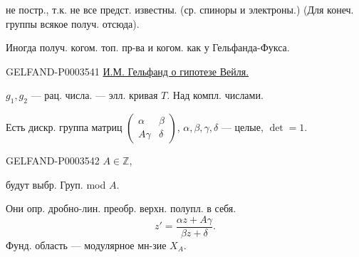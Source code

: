 не постр., т.к. не все предст. известны.
(ср. спиноры и электроны.)
(Для конеч. группы всякое получ. отсюда).

Иногда получ. когом. топ. пр-ва и когом. как у Гельфанда-Фукса.


\begin{GelfandAdjacentEvidence}{GELFAND-P000354}{1}
\uline{И.М. Гельфанд о гипотезе Вейля.}



\end{GelfandAdjacentEvidence}

$g_1,g_2$ --- рац. числа. --- элл. кривая $T$.
Над компл. числами.

Есть дискр. группа матриц $\begin{pmatrix}\alpha&\beta\\A\gamma&\delta\end{pmatrix}$,
$\alpha,\beta,\gamma,\delta$ --- целые, $\det=1$.

\begin{GelfandAdjacentEvidence}{GELFAND-P000354}{2}
$A\in\mathbb Z$,
\end{GelfandAdjacentEvidence}

будут выбр.
Груп. mod $A$.

Они опр. дробно-лин. преобр. верхн. полупл. в себя.
\begin{equation*}z'=\frac{\alpha z+A\gamma}{\beta z+\delta}.\end{equation*}
Фунд. область --- модулярное мн-зие $X_A$.

